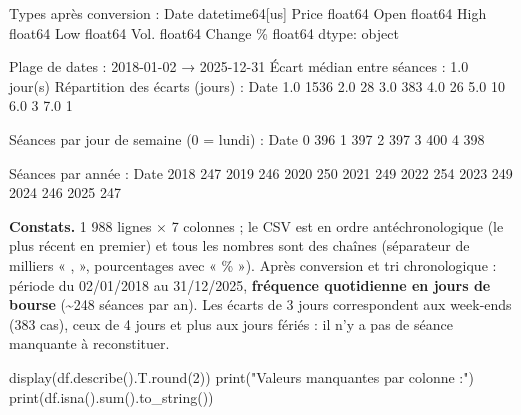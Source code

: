 \documentclass[
  10pt,
]{article}
\newenvironment{Shaded}{}{}
\newcommand{\BuiltInTok}[1]{\textcolor[rgb]{0.00,0.50,0.00}{#1}}
\newcommand{\DecValTok}[1]{\textcolor[rgb]{0.25,0.63,0.44}{#1}}
\newcommand{\NormalTok}[1]{#1}
\newcommand{\StringTok}[1]{\textcolor[rgb]{0.25,0.44,0.63}{#1}}
\begin{document}
\begin{Shaded}
\begin{Highlighting}[]
\NormalTok{Types après conversion :}
\NormalTok{Date        datetime64[us]}
\NormalTok{Price              float64}
\NormalTok{Open               float64}
\NormalTok{High               float64}
\NormalTok{Low                float64}
\NormalTok{Vol.               float64}
\NormalTok{Change \%           float64}
\NormalTok{dtype: object}

\NormalTok{Plage de dates : 2018{-}01{-}02 → 2025{-}12{-}31}
\NormalTok{Écart médian entre séances : 1.0 jour(s)}
\NormalTok{Répartition des écarts (jours) :}
\NormalTok{Date}
\NormalTok{1.0    1536}
\NormalTok{2.0      28}
\NormalTok{3.0     383}
\NormalTok{4.0      26}
\NormalTok{5.0      10}
\NormalTok{6.0       3}
\NormalTok{7.0       1}

\NormalTok{Séances par jour de semaine (0 = lundi) :}
\NormalTok{Date}
\NormalTok{0    396}
\NormalTok{1    397}
\NormalTok{2    397}
\NormalTok{3    400}
\NormalTok{4    398}

\NormalTok{Séances par année :}
\NormalTok{Date}
\NormalTok{2018    247}
\NormalTok{2019    246}
\NormalTok{2020    250}
\NormalTok{2021    249}
\NormalTok{2022    254}
\NormalTok{2023    249}
\NormalTok{2024    246}
\NormalTok{2025    247}
\end{Highlighting}
\end{Shaded}

\textbf{Constats.} 1 988 lignes × 7 colonnes ; le CSV est en ordre
antéchronologique (le plus récent en premier) et tous les nombres sont
des chaînes (séparateur de milliers « , », pourcentages avec « \% »).
Après conversion et tri chronologique : période du 02/01/2018 au
31/12/2025, \textbf{fréquence quotidienne en jours de bourse}
(\textasciitilde248 séances par an). Les écarts de 3 jours correspondent
aux week-ends (383 cas), ceux de 4 jours et plus aux jours fériés : il
n'y a pas de séance manquante à reconstituer.

\begin{Shaded}
\begin{Highlighting}[]
\NormalTok{display(df.describe().T.}\BuiltInTok{round}\NormalTok{(}\DecValTok{2}\NormalTok{))}
\BuiltInTok{print}\NormalTok{(}\StringTok{"Valeurs manquantes par colonne :"}\NormalTok{)}
\BuiltInTok{print}\NormalTok{(df.isna().}\BuiltInTok{sum}\NormalTok{().to\_string())}
\end{Highlighting}
\end{Shaded}
\end{document}
